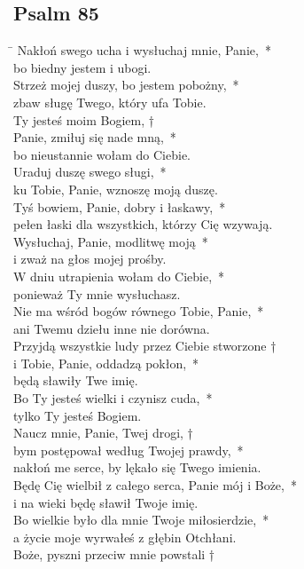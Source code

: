 \subsection*{Psalm 85}
\begin{tabbing}
\hspace{4mm} \= \>\kill
Nakłoń swego ucha i wysłuchaj mnie, Panie,~*\\
bo biedny jestem i ubogi.\\
\>Strzeż mojej duszy, bo jestem pobożny,~*\\
\>zbaw sługę Twego, który ufa Tobie.\\
Ty jesteś moim Bogiem, †\\
Panie, zmiłuj się nade mną,~*\\
bo nieustannie wołam do Ciebie.\\
\>Uraduj duszę swego sługi,~*\\
\>ku Tobie, Panie, wznoszę moją duszę.\\
Tyś bowiem, Panie, dobry i łaskawy,~*\\
pełen łaski dla wszystkich, którzy Cię wzywają.\\
\>Wysłuchaj, Panie, modlitwę moją~*\\
\>i zważ na głos mojej prośby.\\
W dniu utrapienia wołam do Ciebie,~*\\
ponieważ Ty mnie wysłuchasz.\\
\>Nie ma wśród bogów równego Tobie, Panie,~*\\
\>ani Twemu dziełu inne nie dorówna.\\
Przyjdą wszystkie ludy przez Ciebie stworzone †\\
i Tobie, Panie, oddadzą pokłon,~*\\
będą sławiły Twe imię.\\
\>Bo Ty jesteś wielki i czynisz cuda,~*\\
\>tylko Ty jesteś Bogiem.\\
Naucz mnie, Panie, Twej drogi, †\\
bym postępował według Twojej prawdy,~*\\
nakłoń me serce, by lękało się Twego imienia.\\
\>Będę Cię wielbił z całego serca, Panie mój i Boże,~*\\
\>i na wieki będę sławił Twoje imię.\\
Bo wielkie było dla mnie Twoje miłosierdzie,~*\\
a życie moje wyrwałeś z głębin Otchłani.\\
\>Boże, pyszni przeciw mnie powstali †\\

\end{tabbing}
